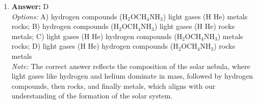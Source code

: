 \documentclass[12pt]{article}
\begin{document}
\begin{enumerate}[label=\arabic*.]
\item \textbf{Answer:} D
\\ \textit{Options:} A) hydrogen compounds (H$_{2}$OCH$_{4}$NH$_{3}$) light gases (H He) metals rocks; B) hydrogen compounds (H$_{2}$OCH$_{4}$NH$_{3}$) light gases (H He) rocks metals; C) light gases (H He) hydrogen compounds (H$_{2}$OCH$_{4}$NH$_{3}$) metals rocks; D) light gases (H He) hydrogen compounds (H$_{2}$OCH$_{4}$NH$_{3}$) rocks metals
\\ \textit{Note:} The correct answer reflects the composition of the solar nebula, where light gases like hydrogen and helium dominate in mass, followed by hydrogen compounds, then rocks, and finally metals, which aligns with our understanding of the formation of the solar system.
\end{enumerate}
\end{document}
